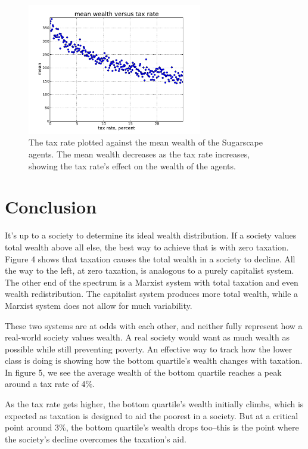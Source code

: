 \begin{figure}[ht]
\centering
\includegraphics[width=3.0in]{figs/mean_wealth.pdf}
\caption{The tax rate plotted against the mean wealth of the Sugarscape agents. The mean wealth decreases as the tax rate increases, showing the tax rate's effect on the wealth of the agents.}
\end{figure}


\section{Conclusion}

It's up to a society to determine its ideal wealth distribution. If a society values total wealth above all else, the best way to achieve that is with zero taxation. Figure 4 shows that taxation causes the total wealth in a society to decline. All the way to the left, at zero taxation, is analogous to a purely capitalist system. The other end of the spectrum is a Marxist system with total taxation and even wealth redistribution. The capitalist system produces more total wealth, while a Marxist system does not allow for much variability.

These two systems are at odds with each other, and neither fully represent how a real-world society values wealth. A real society would want as much wealth as possible while still preventing poverty. An effective way to track how the lower class is doing is showing how the bottom quartile’s wealth changes with taxation. In figure 5, we see the average wealth of the bottom quartile reaches a peak around a tax rate of 4\%. 

As the tax rate gets higher, the bottom quartile's wealth initially climbs, which is expected as taxation is designed to aid the poorest in a society. But at a critical point around 3\%, the bottom quartile's wealth drops too--this is the point where the society's decline overcomes the taxation's aid. 


